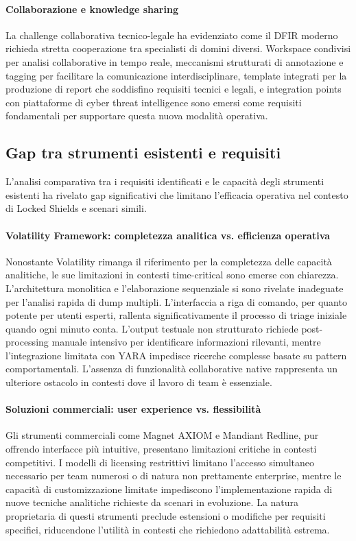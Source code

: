 \paragraph{Collaborazione e knowledge sharing}
La challenge collaborativa tecnico-legale ha evidenziato come il DFIR moderno richieda stretta cooperazione tra specialisti di domini diversi. Workspace condivisi per analisi collaborative in tempo reale, meccanismi strutturati di annotazione e tagging per facilitare la comunicazione interdisciplinare, template integrati per la produzione di report che soddisfino requisiti tecnici e legali, e integration points con piattaforme di cyber threat intelligence sono emersi come requisiti fondamentali per supportare questa nuova modalità operativa.

\subsection{Gap tra strumenti esistenti e requisiti}

L'analisi comparativa tra i requisiti identificati e le capacità degli strumenti esistenti ha rivelato gap significativi che limitano l'efficacia operativa nel contesto di Locked Shields e scenari simili.

\paragraph{Volatility Framework: completezza analitica vs. efficienza operativa}
Nonostante Volatility rimanga il riferimento per la completezza delle capacità analitiche, le sue limitazioni in contesti time-critical sono emerse con chiarezza. L'architettura monolitica e l'elaborazione sequenziale si sono rivelate inadeguate per l'analisi rapida di dump multipli. L'interfaccia a riga di comando, per quanto potente per utenti esperti, rallenta significativamente il processo di triage iniziale quando ogni minuto conta. L'output testuale non strutturato richiede post-processing manuale intensivo per identificare informazioni rilevanti, mentre l'integrazione limitata con YARA impedisce ricerche complesse basate su pattern comportamentali. L'assenza di funzionalità collaborative native rappresenta un ulteriore ostacolo in contesti dove il lavoro di team è essenziale.

\paragraph{Soluzioni commerciali: user experience vs. flessibilità}
Gli strumenti commerciali come Magnet AXIOM e Mandiant Redline, pur offrendo interfacce più intuitive, presentano limitazioni critiche in contesti competitivi. I modelli di licensing restrittivi limitano l'accesso simultaneo necessario per team numerosi o di natura non prettamente enterprise, mentre le capacità di customizzazione limitate impediscono l'implementazione rapida di nuove tecniche analitiche richieste da scenari in evoluzione. La natura proprietaria di questi strumenti preclude estensioni o modifiche per requisiti specifici, riducendone l'utilità in contesti che richiedono adattabilità estrema.

